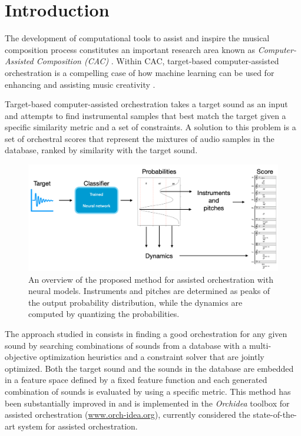 \documentclass[runningheads,a4paper]{llncs}
\begin{document}
%
\section{Introduction}\label{sec:introduction}

The development of computational tools to assist and inspire the musical composition process constitutes an important research area known as \emph{Computer-Assisted Composition (CAC)} \cite{FerVic2013, Ari2005}. Within CAC, target-based computer-assisted orchestration is a compelling case of how machine learning can be used for {enhancing} and {assisting} music creativity \cite{Maresz2003}. 

Target-based computer-assisted orchestration takes a target sound as an input and attempts to find instrumental samples that best match the target given a specific similarity metric and a set of constraints. A solution to this problem is a set of orchestral scores that represent the mixtures of audio samples in the database, ranked by similarity with the target sound. 



\begin{figure}
	\centering
	\includegraphics[scale=0.20]{../latex/figs/method.png}
	\caption{An overview of the proposed method for assisted orchestration with neural models. Instruments and pitches are determined as peaks of the output probability distribution, while the dynamics are computed by quantizing the probabilities. \label{fig:method}}
\end{figure}

The approach studied in \cite{Carpentier2010} consists in finding a good orchestration for any given sound by searching combinations of sounds from a database with a multi-objective optimization heuristics and a constraint solver that are jointly optimized. Both the target sound and the sounds in the database are embedded in a feature space defined by a fixed feature function and each generated combination of sounds is evaluated by using a specific metric. This method has been substantially improved in \cite{Cella18, Cella2020} and is implemented in the \emph{Orchidea} toolbox for assisted orchestration (\url{www.orch-idea.org}), currently considered the state-of-the-art system for assisted orchestration.
\end{document}
